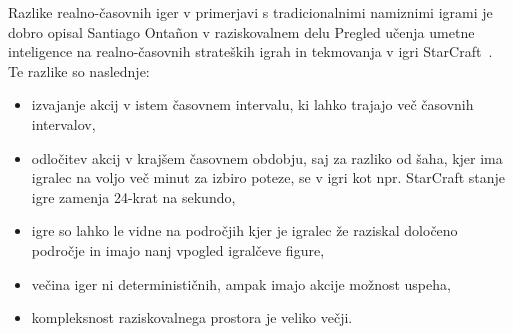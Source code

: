 \documentclass[a4paper, 12pt]{book}
\begin{document}
Razlike realno-časovnih iger v primerjavi s tradicionalnimi namiznimi igrami je dobro opisal Santiago Ontañon v raziskovalnem delu Pregled učenja umetne inteligence na realno-časovnih strateških igrah in tekmovanja v igri StarCraft~\cite{survey_real_time_strategy_ai_research_starcraft}.
Te razlike so naslednje:
\begin{itemize}
	\item izvajanje akcij v istem časovnem intervalu, ki lahko trajajo več časovnih intervalov,
	\item odločitev akcij v krajšem časovnem obdobju, saj za razliko od šaha, kjer ima igralec na voljo več minut za izbiro poteze, se v igri kot npr. StarCraft stanje igre zamenja 24-krat na sekundo,
	\item igre so lahko le vidne na področjih kjer je igralec že raziskal določeno področje in imajo nanj vpogled igralčeve figure,
	\item večina iger ni determinističnih, ampak imajo akcije možnost uspeha,
	\item kompleksnost raziskovalnega prostora je veliko večji.
\end{itemize}
\end{document}
